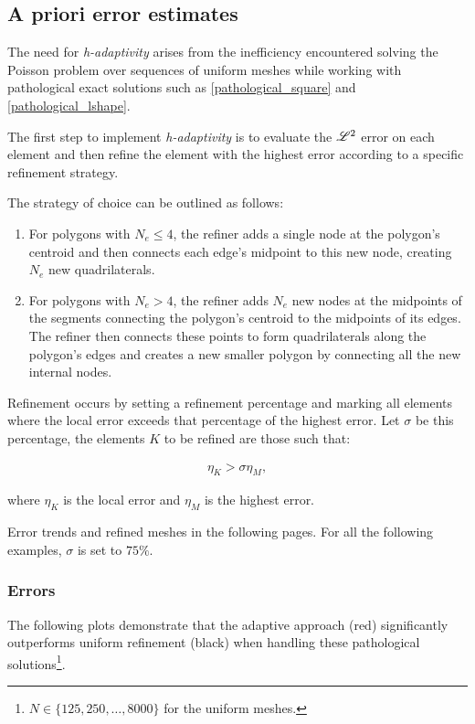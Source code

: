 \subsection{A priori error estimates}

The need for \textit{h-adaptivity} arises from the inefficiency encountered solving the Poisson problem over sequences of uniform meshes while working with pathological exact solutions such as \eqref{pathological_square} and \eqref{pathological_lshape}.

The first step to implement \textit{h-adaptivity} is to evaluate the $\mathscr{L}^2$ error on each element and then refine the element with the highest error according to a specific refinement strategy.

The strategy of choice can be outlined as follows:

\begin{enumerate}
    \item For polygons with $N_e \leq 4$, the refiner adds a single node at the polygon's centroid and then connects each edge's midpoint to this new node, creating $N_e$ new quadrilaterals.
    \item For polygons with $N_e > 4$, the refiner adds $N_e$ new nodes at the midpoints of the segments connecting the polygon's centroid to the midpoints of its edges. The refiner then connects these points to form quadrilaterals along the polygon's edges and creates a new smaller polygon by connecting all the new internal nodes.
\end{enumerate}

Refinement occurs by setting a refinement percentage and marking all elements where the local error exceeds that percentage of the highest error. Let $\sigma$ be this percentage, the elements $K$ to be refined are those such that:

\begin{gather}
	\eta_K > \sigma \eta_{M},
\end{gather}

where $\eta_K$ is the local error and $\eta_M$ is the highest error.

Error trends and refined meshes in the following pages. For all the following examples, $\sigma$ is set to $75\%$.

\newpage
\subsubsection{Errors}

The following plots demonstrate that the adaptive approach (red) significantly outperforms uniform refinement (black) when handling these pathological solutions\footnote{$N \in \{125, 250, \dots, 8000\}$ for the uniform meshes.}.

